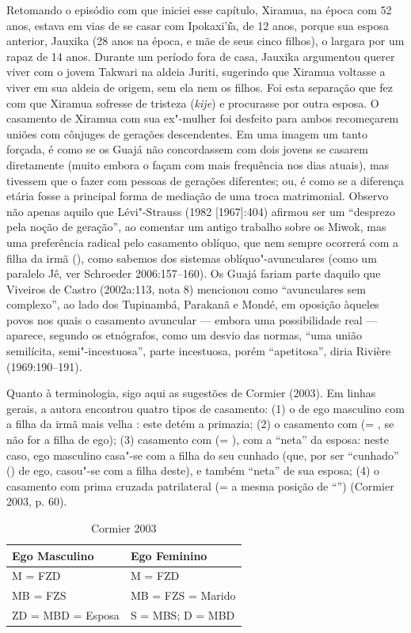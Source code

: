 Retomando o episódio com que iniciei esse capítulo, Xiramua, na época
com 52 anos, estava em vias de se casar com Ipokaxi'ı͂a, de 12 anos,
porque sua esposa anterior, Jauxika (28 anos na época, e mãe de seus
cinco filhos), o largara por um rapaz de 14 anos. Durante um período
fora de casa, Jauxika argumentou querer viver com o jovem Takwari na
aldeia Juriti, sugerindo que Xiramua voltasse a viver em sua aldeia de
origem, sem ela nem os filhos. Foi esta separação que fez com que
Xiramua sofresse de tristeza (\emph{kije}) e procurasse por outra
esposa. O casamento de Xiramua com sua ex"-mulher foi desfeito para ambos
recomeçarem uniões com cônjuges de gerações descendentes. Em uma imagem
um tanto forçada, é como se os Guajá não concordassem com dois jovens se
casarem diretamente (muito embora o façam com mais frequência nos dias
atuais), mas tivessem que o fazer com pessoas de gerações diferentes;
ou, é como se a diferença etária fosse a principal forma de mediação de
uma troca matrimonial. Observo não apenas aquilo que Lévi"-Strauss (1982
{[}1967{]}:404) afirmou ser um ``desprezo pela noção de geração'', ao
comentar um antigo trabalho sobre os Miwok, mas uma preferência radical
pelo casamento oblíquo, que nem sempre ocorrerá com a filha da irmã
(), como sabemos dos sistemas oblíquo"-avunculares (como um paralelo
Jê, ver Schroeder 2006:157--160). Os Guajá fariam parte daquilo que
Viveiros de Castro (2002a:113, nota 8) mencionou como ``avunculares sem
complexo'', ao lado dos Tupinambá, Parakanã e Mondé, em oposição àqueles
povos nos quais o casamento avuncular --- embora uma possibilidade real ---
aparece, segundo os etnógrafos, como um desvio das normas, ``uma união
semilícita, semi"-incestuosa'', parte incestuosa, porém ``apetitosa'', diria
Rivière (1969:190--191).

Quanto à terminologia, sigo aqui as sugestões de Cormier (2003). Em
linhas gerais, a autora encontrou quatro tipos de casamento: (1) o de
ego masculino com a filha da irmã mais velha : este detém a primazia;
(2) o casamento com  (= , se não for a filha de ego); (3) casamento
com  (= ), com a ``neta'' da esposa: neste caso, ego masculino
casa"-se com a filha do seu cunhado (que, por ser ``cunhado'' () de
ego, casou"-se com a filha deste), e também ``neta'' de sua esposa; (4) o
casamento com prima cruzada patrilateral (=  a mesma posição de ``'')
(Cormier 2003, p. 60).

\begin{table}[H]
\centering
\caption{Cormier 2003}
\label{my-label}
\begin{tabular}{|l|l|}
\hline
\textbf{Ego Masculino} & \textbf{Ego Feminino} \\ \hline
M = FZD                & M = FZD               \\ \hline
MB = FZS               & MB = FZS = Marido     \\ \hline
ZD = MBD = Esposa      & S = MBS; D = MBD      \\ \hline
\end{tabular}
\end{table}

